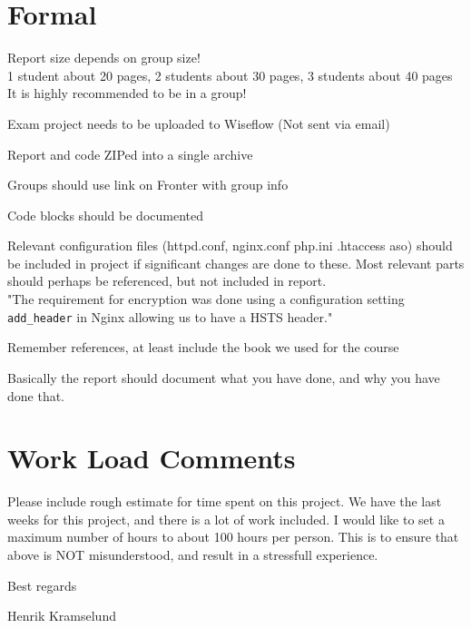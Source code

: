 \documentclass[a4paper,11pt,notitlepage]{report}
\begin{document}
\section*{Formal}
\begin{list2}
\item Report size depends on group size!\\
1 student about 20 pages, 2 students about 30 pages, 3 students about 40 pages\\
It is highly recommended to be in a group!
\item Exam project needs to be uploaded to Wiseflow (Not sent via email)
\item Report and code ZIPed into a single archive
\item Groups should use link on Fronter with group info
\item Code blocks should be documented
\item Relevant configuration files (httpd.conf, nginx.conf php.ini .htaccess aso) should be included in project if significant changes are done to these. Most relevant parts should perhaps be referenced, but not included in report.\\ "The requirement for encryption was done using a configuration setting \verb+add_header+ in Nginx allowing us to have a HSTS header."
\item Remember references, at least include the book we used for the course
\end{list2}

Basically the report should document what you have done, and why you have done that.

\section*{Work Load Comments}

Please include rough estimate for time spent on this project. We have the last weeks for this project, and there is a lot of work included. I would like to set a maximum number of hours to about 100 hours per person. This is to ensure that above is NOT misunderstood, and result in a stressfull experience.

Best regards

Henrik Kramselund
\end{document}
